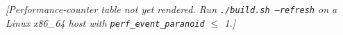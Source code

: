 \textit{[Performance-counter table not yet rendered. Run
\texttt{./build.sh --refresh} on a Linux x86\_64 host with
\texttt{perf\_event\_paranoid} $\le$ 1.]}
